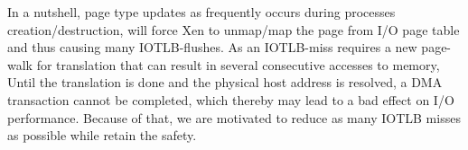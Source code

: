 In a nutshell, page type updates as frequently occurs during processes creation/destruction, will force Xen to unmap/map the page from I/O page table and thus causing many IOTLB-flushes. As an IOTLB-miss requires a new page-walk for translation that can result in several consecutive accesses to memory, Until the translation is done and the physical host address is resolved, a DMA transaction cannot be completed, which thereby may lead to a bad effect on I/O performance. Because of that, we are motivated to reduce as many IOTLB misses as possible while retain the safety.
